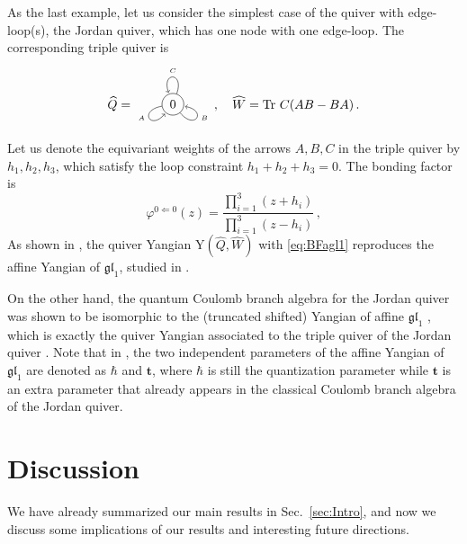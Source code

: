\documentclass[12pt,a4paper]{article}
\renewcommand{\(}{\left(}
\renewcommand{\)}{\right)}
\renewcommand{\(}{\left(}
\renewcommand{\)}{\right)}
\begin{document}
As the last example, let us consider the simplest case of the quiver with edge-loop(s), the Jordan quiver, which has  one node with one edge-loop.
The corresponding triple quiver is 
\begin{equation}
\widehat{Q}=\begin{tikzpicture}[baseline={([yshift=-2ex]current bounding box.center)},vertex/.style={anchor=base, circle,fill=black!25,minimum size=18pt,inner sep=2pt}]
\node (v0) at (0,0) [circle, draw] {$0$};
\draw (v0) edge [in=110,out=70,loop] node [above] {{\tiny $C$}} (v0);
\draw (v0) edge [in=230,out=190,loop] node [left] {{\tiny $A$}} (v0);
\draw (v0) edge [in=350,out=310,loop] node [right] {{\tiny $B$}} (v0);
\end{tikzpicture}\,,\quad
\widehat{W}=\text{Tr}\ C(AB-BA)\,.
\end{equation}
Let us denote the equivariant weights of the arrows $A,B,C$ in the triple quiver by $h_1,h_2,h_3$, which satisfy the loop constraint $h_1+h_2+h_3=0$. 
The bonding factor is 
\begin{equation}\label{eq:BFagl1}
\varphi^{0\Leftarrow0}(z)=\frac{\prod^{3}_{i=1}(z+h_i)}{\prod^{3}_{i=1}(z-h_i)}\,,
\end{equation}
As shown in \cite{Li:2020rij}, the quiver Yangian Y$(\widehat{Q},\widehat{W})$ with \eqref{eq:BFagl1} reproduces the affine Yangian of $\mathfrak{gl}_1$,
studied in \cite{Tsymbaliuk:2014fvq,Prochazka:2015deb,Gaberdiel:2017dbk}.


On the other hand, the quantum Coulomb branch algebra for the Jordan quiver was shown to be isomorphic to the (truncated shifted) Yangian of affine $\mathfrak{gl}_1$ \cite{Kodera:2016faj_jordan_quiver, Rapcak:2020ueh}, which is exactly the quiver Yangian associated to the triple quiver of the Jordan quiver \cite{Li:2020rij}.
Note that in \cite{Kodera:2016faj_jordan_quiver}, the two independent parameters of the affine Yangian of $\mathfrak{gl}_1$ are denoted as $\hbar$ and $\mathbf{t}$, where $\hbar$ is still the quantization parameter while $\mathbf{t}$ is an extra parameter that already appears in the classical Coulomb branch algebra of the Jordan quiver.





\section{Discussion}
\label{sec:Discussion}


We have already summarized our main results in Sec.~\ref{sec:Intro}, and now we discuss some implications of our results and interesting future directions. 
\end{document}
